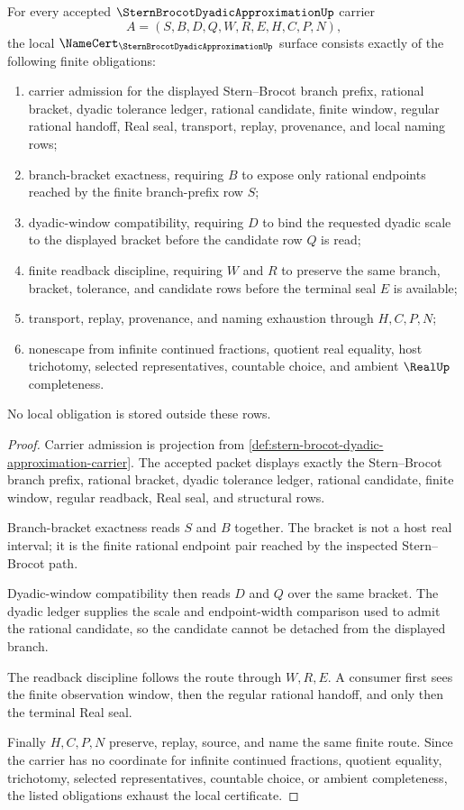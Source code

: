 \begin{theorem}
\label{thm:stern-brocot-dyadic-approximation-namecert-obligations}
For every accepted $\SternBrocotDyadicApproximationUp$ carrier
$$
A=(S,B,D,Q,W,R,E,H,C,P,N),
$$
the local $\NameCert_{\SternBrocotDyadicApproximationUp}$ surface consists exactly of the following finite obligations:
\begin{enumerate}
\item carrier admission for the displayed Stern--Brocot branch prefix, rational bracket, dyadic tolerance ledger, rational candidate, finite window, regular rational handoff, Real seal, transport, replay, provenance, and local naming rows;
\item branch-bracket exactness, requiring $B$ to expose only rational endpoints reached by the finite branch-prefix row $S$;
\item dyadic-window compatibility, requiring $D$ to bind the requested dyadic scale to the displayed bracket before the candidate row $Q$ is read;
\item finite readback discipline, requiring $W$ and $R$ to preserve the same branch, bracket, tolerance, and candidate rows before the terminal seal $E$ is available;
\item transport, replay, provenance, and naming exhaustion through $H,C,P,N$;
\item nonescape from infinite continued fractions, quotient real equality, host trichotomy, selected representatives, countable choice, and ambient $\RealUp$ completeness.
\end{enumerate}
No local obligation is stored outside these rows.
\end{theorem}
\begin{proof}
Carrier admission is projection from \autoref{def:stern-brocot-dyadic-approximation-carrier}. The accepted packet displays exactly the Stern--Brocot branch prefix, rational bracket, dyadic tolerance ledger, rational candidate, finite window, regular readback, Real seal, and structural rows.

Branch-bracket exactness reads $S$ and $B$ together. The bracket is not a host real interval; it is the finite rational endpoint pair reached by the inspected Stern--Brocot path.

Dyadic-window compatibility then reads $D$ and $Q$ over the same bracket. The dyadic ledger supplies the scale and endpoint-width comparison used to admit the rational candidate, so the candidate cannot be detached from the displayed branch.

The readback discipline follows the route through $W,R,E$. A consumer first sees the finite observation window, then the regular rational handoff, and only then the terminal Real seal.

Finally $H,C,P,N$ preserve, replay, source, and name the same finite route. Since the carrier has no coordinate for infinite continued fractions, quotient equality, trichotomy, selected representatives, countable choice, or ambient completeness, the listed obligations exhaust the local certificate.
\end{proof}

